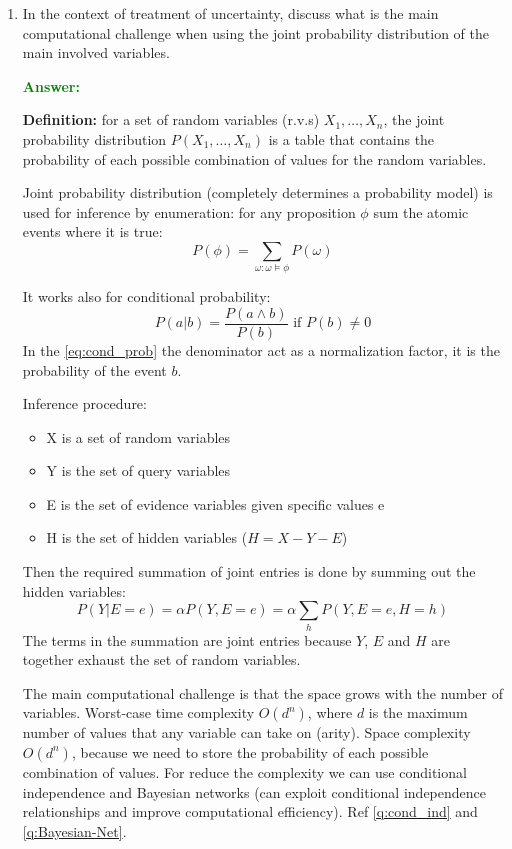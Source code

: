 \documentclass[12pt]{article}
\begin{document}
\begin{enumerate}[label=\textbf{U.\arabic*}]
    \item\label{q:joint-prob} In the context of treatment of uncertainty, discuss what is the main computational challenge when using the joint probability distribution of the main involved variables.
    
    \textcolor{green}{\textbf{Answer:}}

    \textbf{Definition:} for a set of random variables (r.v.s) $X_1,\ldots,X_n$, the joint probability distribution $P(X_1,\ldots,X_n)$ is a table that contains the probability of each possible combination of values for the random variables.

    Joint probability distribution (completely determines a probability model) is used for inference by enumeration: for any proposition $\phi$ sum the atomic events where it is true:
    \begin{equation}
        P(\phi) = \sum_{\omega:\omega\vDash\phi}P(\omega)
    \end{equation} 

    It works also for conditional probability:
    \begin{equation}\label{eq:cond_prob}
        P(a|b) = \frac{P(a\land b)}{P(b)} \text{ if } P(b) \neq 0
    \end{equation}
    In the \ref{eq:cond_prob} the denominator act as a normalization factor, it is the probability of the event $b$.

    Inference procedure: 
    \begin{itemize}
        \item X is a set of random variables 
        \item Y is the set of query variables  
        \item E is the set of evidence variables given specific values e
        \item H is the set of hidden variables ($H = X - Y - E$)
    \end{itemize}
    Then the required summation of joint entries is done by summing out the hidden variables:
    \begin{equation}
        P(Y|E = e) = \alpha P(Y,E = e) = \alpha\sum_{h}P(Y,E = e,H = h)
    \end{equation}
    The terms in the summation are joint entries because $Y$, $E$ and $H$ are together exhaust the set of random variables.

    The main computational challenge is that the space grows with the number of variables.
    Worst-case time complexity $O(d^n)$, where $d$ is the maximum number of values that any variable can take on (arity).
    Space complexity $O(d^n)$, because we need to store the probability of each possible combination of values.
    For reduce the complexity we can use conditional independence and Bayesian networks (can exploit conditional independence relationships and improve computational efficiency). Ref \ref{q:cond_ind} and \ref{q:Bayesian-Net}.


\end{enumerate}
\end{document}
